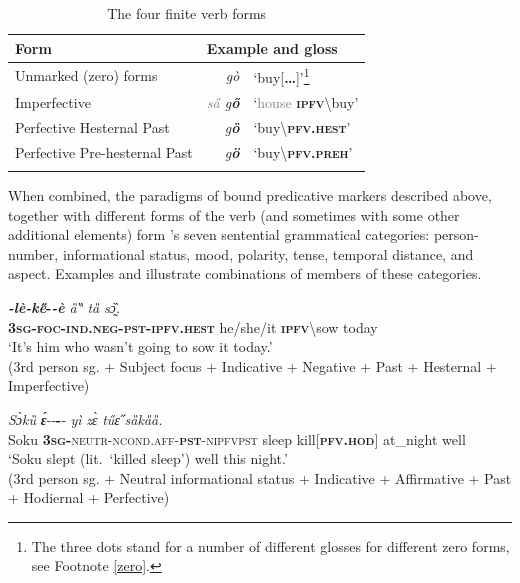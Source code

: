\documentclass[output=paper,colorlinks,citecolor=brown]{langscibook}
\begin{document}
\begin{table}[t]
\begin{tabularx}{\textwidth}{Xrl}
\lsptoprule
Form & \multicolumn{2}{l}{Example and gloss} \\ \midrule
Unmarked (zero) forms & \textit{gò} & `buy[\textbf{\dots}]'\footnote{The three dots stand for a number of different glosses for different zero forms, see Footnote \ref{zero}.} \\
Imperfective & \textit{\textcolor{gray}{sa̋} g\textbf{ő}} & `\textcolor{gray}{house} \textsc{\textbf{ipfv}}\backslash buy' \\
Perfective Hesternal Past & \textit{g\textbf{ȍ}} & `buy\backslash\textsc{\textbf{pfv.hest}}' \\
Perfective Pre-hesternal Past & \textit{g\textbf{ö}} & `buy\backslash\textsc{\textbf{pfv.preh}}' \\ 
\lspbottomrule
\end{tabularx}
\caption{The four finite verb forms}
\label{tab5}
\end{table}


When combined, the paradigms of bound predicative markers described above, together with different forms of the verb (and sometimes with some other additional elements) form 's seven sentential grammatical categories: person-number, informational status, mood, polarity, tense, temporal distance, and aspect. 
Examples  and  illustrate combinations of members of these categories.



\ea \label{ex:Fed6}%
\gll \textit{\textbf{{\E}-lè-ke̋}}\textbf{\upshape-\textupstep}\textit{\textbf{-è}} \textit{ȁ‶} \textit{tȁ} \textit{sɔ̰̏.} \\
\textsc{\textbf{3sg-foc-ind.neg-pst-ipfv.hest}} he/she/it \textsc{\textbf{ipfv}}\backslash sow today \\
\glt `It's him who wasn't going to sow it today.' \\
(3rd person sg. + Subject focus + Indicative + Negative + Past + Hesternal + Imperfective)


\ex \label{ex:Fed7}
\gll \textit{Sɔ̀kȕ} {\textbf{\textit{\'ɛ}}‑\FedotovBoldEmpty{}‑\FedotovBoldEmpty{}\textbf{\upshape-\textupstep}‑\FedotovBoldEmpty{}\textup{\footnotemark}} \textit{yì} \textit{zɛ̀} \textit{tűɛ̋} \textit{sȁkȁȁ.}\\
Soku \textsc{\textbf{3sg-}neutr-ncond.aff-\textbf{pst}-nipfvpst} sleep kill\textsc{[\textbf{pfv.hod}]} at\_night well\\
\glt `Soku slept (lit.\ `killed sleep') well this night.' \\
(3rd person sg. + Neutral informational status + Indicative + Affirmative + Past + Hodiernal + Perfective)
\z
\end{document}
